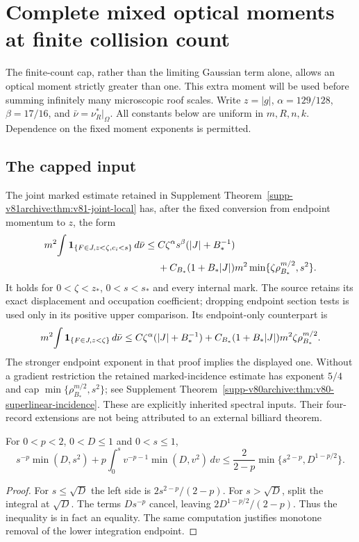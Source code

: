 \section{Complete mixed optical moments at finite collision count}
\label{sec:v86-moments}
The finite-count cap, rather than the limiting Gaussian term alone,
allows an optical moment strictly greater than one. This extra moment
will be used before summing infinitely many microscopic roof scales.
Write $z=|g|$, $\alpha=129/128$, $\beta=17/16$, and
$\bar\nu=\nu_R^*|_\Omega$. All constants below are uniform in $m,R,n,k$.
Dependence on the fixed moment exponents is permitted.

\subsection{The capped input}
The joint marked estimate retained in Supplement
Theorem~\ref{supp-v81archive:thm:v81-joint-local} has, after the
fixed conversion from endpoint momentum to $z$, the form
\begin{align}
 m^2\!\int \one_{\{F\in J,z<\zeta,c_i<s\}}\,d\bar\nu
 \le{}& C\zeta^\alpha s^\beta(|J|+B_*^{-1})\notag\\
 &+C_{B_*}(1+B_*|J|)m^2
            \min\{\zeta\rho_{B_*}^{m/2},s^2\}.
                                      \label{eq:v86-joint-input}
\end{align}
It holds for $0<\zeta<z_*$, $0<s<s_*$ and every internal mark.
The source retains its exact displacement and occupation coefficient;
dropping endpoint section tests is used only in its positive upper
comparison. Its endpoint-only counterpart is
\begin{equation}\label{eq:v86-endpoint-input}
 m^2\!\int\one_{\{F\in J,z<\zeta\}}\,d\bar\nu
 \le C\zeta^\alpha(|J|+B_*^{-1})
   +C_{B_*}(1+B_*|J|)m^2\zeta\rho_{B_*}^{m/2}.
\end{equation}
The stronger endpoint exponent in that proof implies the displayed
one. Without a gradient restriction the retained marked-incidence
estimate has exponent $5/4$ and cap
$\min\{\rho_{B_*}^{m/2},s^2\}$; see Supplement
Theorem~\ref{supp-v80archive:thm:v80-superlinear-incidence}.
These are explicitly inherited spectral inputs. Their four-record
extensions are not being attributed to an external billiard theorem.

\begin{lemma}\label{lem:v86-cap}
For $0<p<2$, $0<D\le1$ and $0<s\le1$,
\begin{equation}\label{eq:v86-cap}
 s^{-p}\min(D,s^2)+p\int_0^s v^{-p-1}\min(D,v^2)\,dv
 \le \frac{2}{2-p}\min\{s^{2-p},D^{1-p/2}\}.
\end{equation}
\end{lemma}
\begin{proof}
For $s\le\sqrt D$ the left side is $2s^{2-p}/(2-p)$.
For $s>\sqrt D$, split the integral at $\sqrt D$. The terms
$Ds^{-p}$ cancel, leaving $2D^{1-p/2}/(2-p)$. Thus the inequality
is in fact an equality. The same computation justifies monotone
removal of the lower integration endpoint.
\end{proof}

